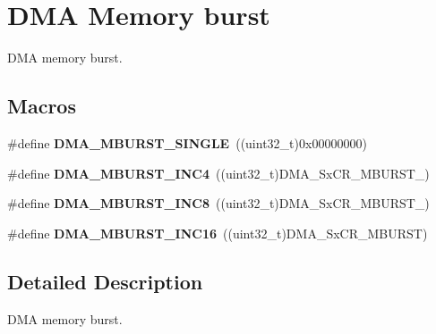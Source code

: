 \hypertarget{group___d_m_a___memory__burst}{}\section{D\+MA Memory burst}
\label{group___d_m_a___memory__burst}


D\+MA memory burst.  


\subsection*{Macros}
\begin{DoxyCompactItemize}
\item 
\#define {\bfseries D\+M\+A\+\_\+\+M\+B\+U\+R\+S\+T\+\_\+\+S\+I\+N\+G\+LE}~((uint32\+\_\+t)0x00000000)\hypertarget{group___d_m_a___memory__burst_ga4e94b7250e6a4f53d702b42b15796953}{}\label{group___d_m_a___memory__burst_ga4e94b7250e6a4f53d702b42b15796953}

\item 
\#define {\bfseries D\+M\+A\+\_\+\+M\+B\+U\+R\+S\+T\+\_\+\+I\+N\+C4}~((uint32\+\_\+t)D\+M\+A\+\_\+\+Sx\+C\+R\+\_\+\+M\+B\+U\+R\+S\+T\+\_)\hypertarget{group___d_m_a___memory__burst_gac9efcb13b2f0a715edb931dde213c000}{}\label{group___d_m_a___memory__burst_gac9efcb13b2f0a715edb931dde213c000}

\item 
\#define {\bfseries D\+M\+A\+\_\+\+M\+B\+U\+R\+S\+T\+\_\+\+I\+N\+C8}~((uint32\+\_\+t)D\+M\+A\+\_\+\+Sx\+C\+R\+\_\+\+M\+B\+U\+R\+S\+T\+\_)\hypertarget{group___d_m_a___memory__burst_ga4b8834930bb3b93cd3fcf04660b6933d}{}\label{group___d_m_a___memory__burst_ga4b8834930bb3b93cd3fcf04660b6933d}

\item 
\#define {\bfseries D\+M\+A\+\_\+\+M\+B\+U\+R\+S\+T\+\_\+\+I\+N\+C16}~((uint32\+\_\+t)D\+M\+A\+\_\+\+Sx\+C\+R\+\_\+\+M\+B\+U\+R\+ST)\hypertarget{group___d_m_a___memory__burst_ga7812aea620b09c4f4281d614d86e6094}{}\label{group___d_m_a___memory__burst_ga7812aea620b09c4f4281d614d86e6094}

\end{DoxyCompactItemize}


\subsection{Detailed Description}
D\+MA memory burst. 

